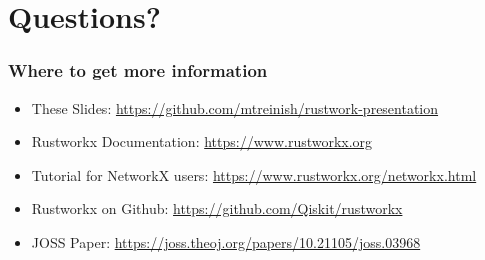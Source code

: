 \documentclass[aspectratio=169,11pt,hyperref={colorlinks=true}]{beamer}
\begin{document}
\section{Questions?}
\begin{frame}
\frametitle{Where to get more information}
    \begin{itemize}
        \item These Slides: \href{https://github.com/mtreinish/rustwork-presentation}{https://github.com/mtreinish/rustwork-presentation}
        \item Rustworkx Documentation: \href{https://www.rustworkx.org}{https://www.rustworkx.org}
        \item Tutorial for NetworkX users: \href{https://www.rustworkx.org/networkx.html}{https://www.rustworkx.org/networkx.html}
        \item Rustworkx on Github: \href{https://github.com/Qiskit/rustworkx}{https://github.com/Qiskit/rustworkx}
        \item JOSS Paper: \href{https://joss.theoj.org/papers/10.21105/joss.03968}{https://joss.theoj.org/papers/10.21105/joss.03968}
    \end{itemize}
\end{frame}
\end{document}
